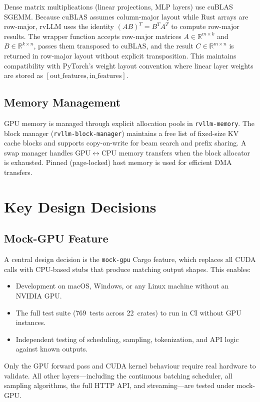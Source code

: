 \documentclass[11pt,a4paper]{article}
\begin{document}
Dense matrix multiplications (linear projections, MLP layers) use cuBLAS SGEMM.
Because cuBLAS assumes column-major layout while Rust arrays are row-major, rvLLM
uses the identity $(AB)^T = B^T A^T$ to compute row-major results. The wrapper
function accepts row-major matrices $A \in \mathbb{R}^{m \times k}$ and
$B \in \mathbb{R}^{k \times n}$, passes them transposed to cuBLAS, and the
result $C \in \mathbb{R}^{m \times n}$ is returned in row-major layout without
explicit transposition. This maintains compatibility with PyTorch's weight layout
convention where linear layer weights are stored as $[\text{out\_features},
\text{in\_features}]$.

\subsection{Memory Management}

GPU memory is managed through explicit allocation pools in \texttt{rvllm-memory}.
The block manager (\texttt{rvllm-block-manager}) maintains a free list of fixed-size
KV cache blocks and supports copy-on-write for beam search and prefix sharing. A swap
manager handles GPU$\leftrightarrow$CPU memory transfers when the block allocator is
exhausted. Pinned (page-locked) host memory is used for efficient DMA transfers.

\section{Key Design Decisions}
\label{sec:design}

\subsection{Mock-GPU Feature}

A central design decision is the \texttt{mock-gpu} Cargo feature, which replaces all
CUDA calls with CPU-based stubs that produce matching output shapes. This enables:
\begin{itemize}
  \item Development on macOS, Windows, or any Linux machine without an NVIDIA GPU.
  \item The full test suite (769~tests across 22~crates) to run in CI without GPU
        instances.
  \item Independent testing of scheduling, sampling, tokenization, and API logic
        against known outputs.
\end{itemize}
Only the GPU forward pass and CUDA kernel behaviour require real hardware to validate.
All other layers---including the continuous batching scheduler, all sampling algorithms,
the full HTTP API, and streaming---are tested under mock-GPU.
\end{document}
